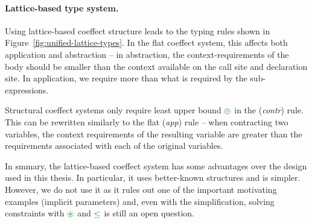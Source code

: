 
\paragraph{Lattice-based type system.}
\hspace{-1em}
Using lattice-based coeffect structure leads to the typing rules shown in Figure~\ref{fig:unified-lattice-types}.
In the flat coeffect system, this affects both application and abstraction -- in abstraction,
the context-requirements of the body should be smaller than the context available on the 
call site and declaration site. In application, we require more than what is required by
the sub-expressions.

Structural coeffect systems only require least upper bound $\cpar$ in the (\emph{contr}) rule.
This can be rewritten similarly to the flat (\emph{app}) rule --  when contracting two variables, the
context requirements of the resulting variable are greater than the requirements associated with
each of the original variables.

In smmary, the lattice-based coeffect system has some advantages over the design used in this
thesis. In particular, it uses better-known structures and is simpler. However, we do not use
it as it rules out one of the important motivating examples (implicit parameters) and, even with
the simplification, solving constraints with $\cseq$ and $\cleq$ is still an open question.



%                                                                                             

